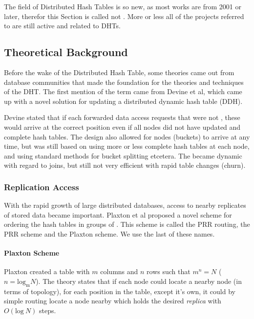 The field of Distributed Hash Tables is so new, as most works are from 2001
 or later, therefor this Section is called 
 not .
 More or less all of the projects referred to are still active and
 related to DHTs.

\subsection{Theoretical Background}

Before the wake of the Distributed Hash Table, some theories came out from database
 communities that made the foundation for the theories and techniques of the DHT.
 The first mention of the term  came from
 Devine et al\cite{devine-93-design}, which came up with a novel solution for
 updating a distributed dynamic hash table (DDH).

Devine stated that if each forwarded data access requests that were not ,
 these would arrive at the correct position even if all nodes did not have updated
 and complete hash tables. The design also allowed for nodes (buckets) to arrive at any
 time, but was still based on using
 more or less complete hash tables at each node, and using standard methods for
 bucket splitting etcetera. The  became dynamic with
 regard to joins,
 but still not very efficient with rapid table changes (churn).

\subsubsection{Replication Access}

With the rapid growth of large distributed databases, access to nearby replicates
 of stored data became important. Plaxton et al\cite{plaxton-97-accessing-nearby}
 proposed a novel scheme for ordering the hash tables in groups of
 . This scheme is called the PRR routing, the PRR scheme and
 the Plaxton scheme. We use the last of these names.

\paragraph{Plaxton Scheme}
\label{theory:PlaxtonScheme}

Plaxton created a table with $m$ columns and $n$ rows such that $m^n=N$
 ($n=\mathrm{log_m}N$). The theory states
 that if each node could locate a nearby node (in terms of topology), for each
 position in the table, except it's own, it could by simple routing locate
 a node nearby which holds the desired \emph{replica} with $O(\mathrm{log\ }N)$ steps.

